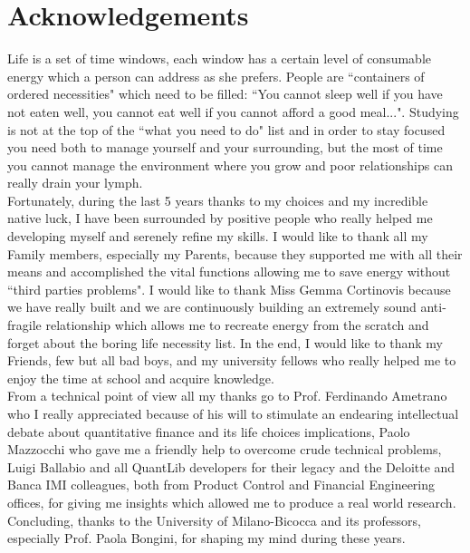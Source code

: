 \chapter*{Acknowledgements}

Life is a set of time windows, each window has a certain level of consumable energy which a person can address as she prefers.
People are ``containers of ordered necessities" which need to be filled: ``You cannot sleep well if you have not eaten well, you cannot eat well if you cannot afford a good meal...".
Studying is not at the top of the ``what you need to do" list and in order to stay focused you need both to manage yourself and your surrounding, but the most of time you cannot manage the environment where you grow and poor relationships can really drain your lymph.\\

Fortunately, during the last 5 years thanks to my choices and my incredible native luck, I have been surrounded by positive people who really helped me developing myself and serenely refine my skills.
I would like to thank all my Family members, especially my Parents, because they supported me with all their means and accomplished the vital functions allowing me to save energy without ``third parties problems".
I would like to thank Miss Gemma Cortinovis because we have really built and we are continuously building an extremely sound anti-fragile relationship which allows me to recreate energy from the scratch and forget about the boring life necessity list.
In the end, I would like to thank my Friends, few but all bad boys, and my university fellows who really helped me to enjoy the time at school and acquire knowledge.\\

From a technical point of view all my thanks go to Prof. Ferdinando Ametrano who I really appreciated because of his will to stimulate an endearing intellectual debate about quantitative finance and its life choices implications, Paolo Mazzocchi who gave me a friendly help to overcome crude technical problems, Luigi Ballabio and all QuantLib developers for their legacy and the Deloitte and Banca IMI colleagues, both from Product Control and Financial Engineering offices, for giving me insights which allowed me to produce a real world research.
Concluding, thanks to the University of Milano-Bicocca and its professors, especially Prof. Paola Bongini, for shaping my mind during these years.
